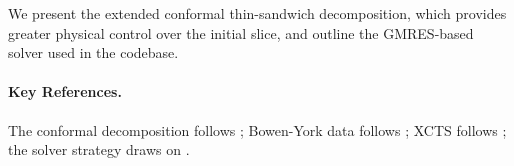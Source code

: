 We present the extended conformal thin-sandwich decomposition, which provides
greater physical control over the initial slice, and outline the GMRES-based
solver used in the codebase.

\paragraph{Key References.}
The conformal decomposition follows \cite{York1979,Cook2000}; Bowen-York data
follows \cite{Bowen1980}; XCTS follows \cite{Pfeiffer2003}; the solver
strategy draws on \cite{Baumgarte2010}.

